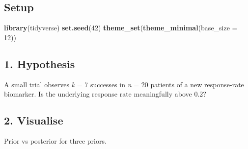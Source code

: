 \documentclass[
]{article}
\newenvironment{Shaded}{\begin{snugshade}}{\end{snugshade}}
\newcommand{\AttributeTok}[1]{\textcolor[rgb]{0.13,0.29,0.53}{#1}}
\newcommand{\DecValTok}[1]{\textcolor[rgb]{0.00,0.00,0.81}{#1}}
\newcommand{\FunctionTok}[1]{\textcolor[rgb]{0.13,0.29,0.53}{\textbf{#1}}}
\newcommand{\NormalTok}[1]{#1}
\begin{document}
\subsection{Setup}\label{setup}

\begin{Shaded}
\begin{Highlighting}[]
\FunctionTok{library}\NormalTok{(tidyverse)}
\FunctionTok{set.seed}\NormalTok{(}\DecValTok{42}\NormalTok{)}
\FunctionTok{theme\_set}\NormalTok{(}\FunctionTok{theme\_minimal}\NormalTok{(}\AttributeTok{base\_size =} \DecValTok{12}\NormalTok{))}
\end{Highlighting}
\end{Shaded}

\subsection{1. Hypothesis}\label{hypothesis}

A small trial observes \emph{k} = 7 successes in \emph{n} = 20 patients
of a new response-rate biomarker. Is the underlying response rate
meaningfully above 0.2?

\subsection{2. Visualise}\label{visualise}

Prior vs posterior for three priors.
\end{document}
